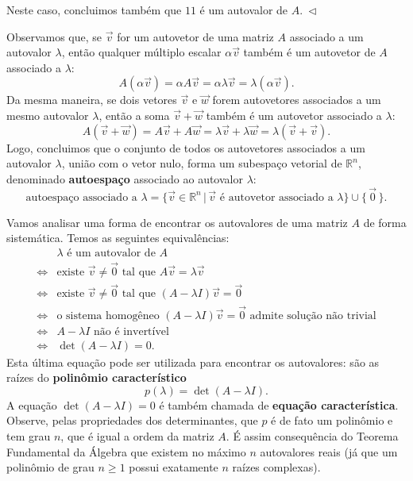 \documentclass[../livro.tex]{subfiles}  %
\begin{document}
\begin{example}
\begin{equation}
	\end{equation} Neste caso, concluimos também que $11$ é um autovalor de $A. \ \lhd$
\end{example}

Observamos que, se $\vec{v}$ for um autovetor de uma matriz $A$ associado a um autovalor $\lambda$, então qualquer múltiplo escalar $\alpha \vec{v}$ também é um autovetor de $A$ associado a $\lambda$:
\begin{equation}
A (\alpha \vec{v}) = \alpha A \vec{v} = \alpha \lambda \vec{v} = \lambda (\alpha \vec{v}).
\end{equation} Da mesma maneira, se dois vetores $\vec{v}$ e $\vec{w}$ forem autovetores associados a um mesmo autovalor $\lambda$, então a soma $\vec{v} + \vec{w}$ também é um autovetor associado a $\lambda$:
\begin{equation}
A (\vec{v} + \vec{w}) = A \vec{v} + A \vec{w} =  \lambda \vec{v} + \lambda \vec{w} = \lambda (\vec{v} + \vec{v}).
\end{equation} Logo, concluimos que o conjunto de todos os autovetores associados a um autovalor $\lambda$, união com o vetor nulo, forma um subespaço vetorial de $\mathbb{R}^n$, denominado \textbf{autoespaço} associado ao autovalor $\lambda$:
\begin{equation}
\text{autoespaço associado a } \lambda = \big\{ \vec{v} \in \mathbb{R}^n \, | \, \vec{v} \text{ é autovetor associado a } \lambda \big\} \cup \{\, \vec{0}\, \}.
\end{equation}

Vamos analisar uma forma de encontrar os autovalores de uma matriz $A$ de forma sistemática. Temos as seguintes equivalências:
\begin{align*}
& \lambda \text{ é um autovalor de $A$} \\
\iff & \text{existe } \vec{v} \neq \vec{0} \text{ tal que } A \vec{v} = \lambda \vec{v} \\
\iff & \text{existe } \vec{v} \neq \vec{0} \text{ tal que } (A - \lambda I)\vec{v} = \vec{0} \\
\iff & \text{o sistema homogêneo } (A - \lambda I)\vec{v} = \vec{0} \text{ admite solução não trivial} \\
\iff & A - \lambda I \text{ não é invertível} \\
\iff & \det (A - \lambda I) = 0.
\end{align*}
Esta última equação pode ser utilizada para encontrar os autovalores: são as raízes do \textbf{polinômio característico}
\begin{equation}
p(\lambda) = \det (A - \lambda I).
\end{equation} A equação $\det (A - \lambda I) = 0$ é também chamada de \textbf{equação característica}. Observe, pelas propriedades dos determinantes, que $p$ é de fato um polinômio e tem grau $n$, que é igual a ordem da matriz $A$. É assim consequência do Teorema Fundamental da Álgebra que existem no máximo $n$ autovalores reais (já que um polinômio de grau $n\ge 1$ possui exatamente $n$ raízes complexas).
\end{document}
